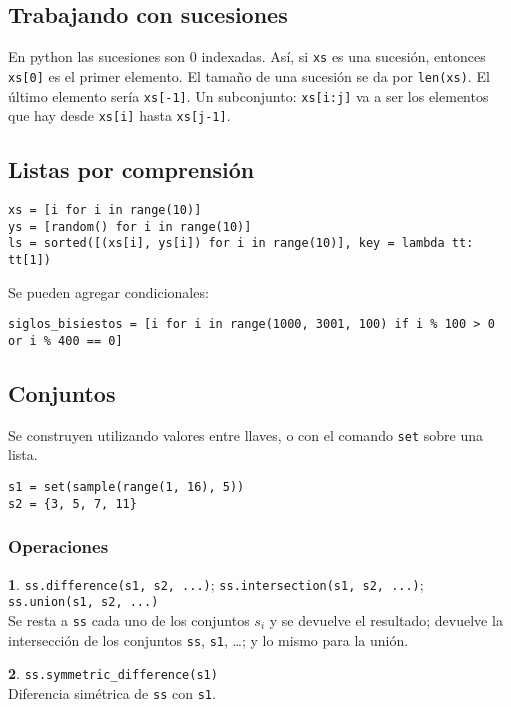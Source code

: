 \documentclass[12pt]{article}
\theoremstyle{definition}
\newtheorem{funcion}{}[section]
\begin{document}
\subsection{Trabajando con sucesiones}

En python las sucesiones son 0 indexadas. Así, si \verb|xs| es una sucesión, entonces \verb|xs[0]| es el primer elemento. El tamaño de una sucesión se da por \verb|len(xs)|. El último elemento sería \verb|xs[-1]|. Un subconjunto: \verb|xs[i:j]| va a ser los elementos que hay desde \verb|xs[i]| hasta \verb|xs[j-1]|.

\subsection{Listas por comprensión}
\small
\begin{verbatim}
xs = [i for i in range(10)]
ys = [random() for i in range(10)]
ls = sorted([(xs[i], ys[i]) for i in range(10)], key = lambda tt: tt[1])
\end{verbatim}
\normalsize

\noindent Se pueden agregar condicionales:
\small
\begin{verbatim}
siglos_bisiestos = [i for i in range(1000, 3001, 100) if i % 100 > 0 or i % 400 == 0]
\end{verbatim}
\normalsize

\subsection{Conjuntos}
Se construyen utilizando valores entre llaves, o con el comando \verb|set| sobre una lista.
\small
\begin{verbatim}
s1 = set(sample(range(1, 16), 5))
s2 = {3, 5, 7, 11}
\end{verbatim}
\normalsize

\subsubsection{Operaciones}
\begin{funcion}
  \verb|ss.difference(s1, s2, ...)|; \verb|ss.intersection(s1, s2, ...)|; \verb|ss.union(s1, s2, ...)| \\[1ex]
  Se resta a \verb|ss| cada uno de los conjuntos $s_i$ y se devuelve el resultado; devuelve la intersección de los conjuntos \verb|ss|, \verb|s1|, \dots; y lo mismo para la unión.
\end{funcion}

\begin{funcion}
  \verb|ss.symmetric_difference(s1)| \\[1ex]
  Diferencia simétrica de \verb|ss| con \verb|s1|.
\end{funcion}
\end{document}
